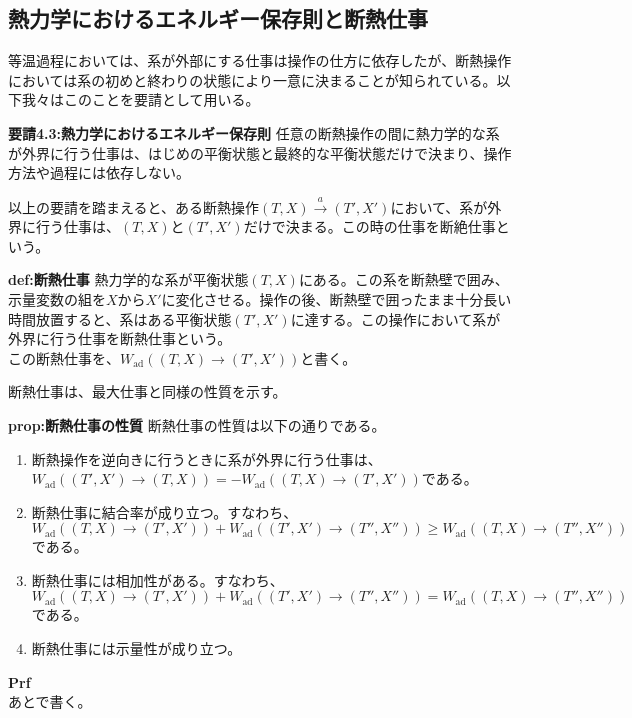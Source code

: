 \documentclass[a4paper,11pt]{jsarticle}
\begin{document}
\subsection{熱力学におけるエネルギー保存則と断熱仕事}
等温過程においては、系が外部にする仕事は操作の仕方に依存したが、断熱操作においては系の初めと終わりの状態により一意に決まることが知られている。以下我々はこのことを要請として用いる。\\
\begin{itembox}[l]{\textbf{要請4.3:熱力学におけるエネルギー保存則}}
    任意の断熱操作の間に熱力学的な系が外界に行う仕事は、はじめの平衡状態と最終的な平衡状態だけで決まり、操作方法や過程には依存しない。
\end{itembox}
以上の要請を踏まえると、ある断熱操作$(T,X) \xrightarrow{a} (T',X')$において、系が外界に行う仕事は、$(T,X)$と$(T',X')$だけで決まる。この時の仕事を断絶仕事という。\\
\begin{itembox}[l]{\textbf{def:断熱仕事}}
    熱力学的な系が平衡状態$(T,X)$にある。この系を断熱壁で囲み、示量変数の組を$X$から$X'$に変化させる。操作の後、断熱壁で囲ったまま十分長い時間放置すると、系はある平衡状態$(T',X')$に達する。この操作において系が外界に行う仕事を断熱仕事という。\\
    この断熱仕事を、$W_{\text{ad}}((T,X)\rightarrow (T',X'))$と書く。
\end{itembox}
断熱仕事は、最大仕事と同様の性質を示す。\\
\begin{itembox}[l]{\textbf{prop:断熱仕事の性質}}
    断熱仕事の性質は以下の通りである。
    \begin{enumerate}
        \item 断熱操作を逆向きに行うときに系が外界に行う仕事は、$W_{\text{ad}}((T',X')\rightarrow (T,X)) = -W_{\text{ad}}((T,X)\rightarrow (T',X'))$である。
        \item 断熱仕事に結合率が成り立つ。すなわち、$W_{\text{ad}}((T,X)\rightarrow (T',X'))+W_{\text{ad}}((T',X')\rightarrow (T'',X'')) \geq W_{\text{ad}}((T,X)\rightarrow (T'',X''))$である。
        \item 断熱仕事には相加性がある。すなわち、$W_{\text{ad}}((T,X)\rightarrow (T',X'))+W_{\text{ad}}((T',X')\rightarrow (T'',X'')) = W_{\text{ad}}((T,X)\rightarrow (T'',X''))$である。
        \item 断熱仕事には示量性が成り立つ。
    \end{enumerate} 
\end{itembox}
\textbf{Prf}\\
あとで書く。\\
\end{document}
